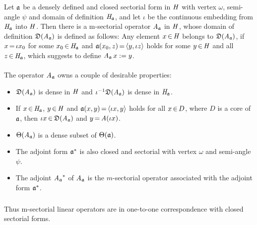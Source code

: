 \documentclass[11pt,twoside]{article}
\begin{document}
\begin{theorem1}\label{FIRST_REPRESENTATION_THEOREM}
Let $\mathfrak{a}$ be a densely defined and closed sectorial form in $\mathit{H}$
with vertex $\omega$, semi-angle $\psi$ and domain of definition $\mathit{H}_{\mathfrak{a}}$,
and let $\iota$ be the continuous embedding from $\mathit{H}_{\mathfrak{a}}$ into $\mathit{H}$.
Then there is a m-sectorial operator $\mathit{A}_{\mathfrak{a}}$ in $\mathit{H}$,
whose domain of definition $\mathfrak{D}(\mathit{A}_{\mathfrak{a}})$ is defined as follows:
Any element $x {\,\in\,} \mathit{H}$ belongs to $\mathfrak{D}(\mathit{A}_{\mathfrak{a}})$,
if $x {\,=\,} \iota x_0$ for some $x_0 {\,\in\,} \mathit{H}_{\mathfrak{a}}$ and
$\mathfrak{a}(x_0,z) {\,=\,} \langle y,\iota z \rangle$ holds
for some $y {\,\in\,} \mathit{H}$ and all $z {\,\in\,} \mathit{H}_{\mathfrak{a}}$,
which suggests to define $\mathit{A}_{\mathfrak{a}} \, x := y$.

\paragraph{} %
The operator $\mathit{A}_{\mathfrak{a}}$ owns a couple of desirable properties:

\begin{itemize}[leftmargin=9mm]
\item[(a)]
$\mathfrak{D}(\mathit{A}_{\mathfrak{a}})$ is dense in $\mathit{H}$
and $\iota^{-1} \mathfrak{D}(\mathit{A}_{\mathfrak{a}})$ is dense in $\mathit{H}_{\mathfrak{a}}$.

\item[(b)]
If $x {\,\in\,} \mathit{H}_{\mathfrak{a}}$, $y {\,\in\,} \mathit{H}$
and $\mathfrak{a}(x,y) {\,=\,} \langle \iota x,y \rangle$ holds for all $x {\,\in\,} D$,
where $D$ is a core of $\mathfrak{a}$,
then $\iota x {\,\in\,} \mathfrak{D}(\mathit{A}_{\mathfrak{a}})$ and $y {\,=\,} \mathit{A} (\iota x)$.

\item[(c)]
$\Theta(\mathit{A}_{\mathfrak{a}})$ is a dense subset of $\Theta(\mathfrak{a})$.

\item[(d)]
The adjoint form $\mathfrak{a}^*$ is also closed and sectorial
with vertex $\omega$ and semi-angle $\psi$.

\item[(e)]
The adjoint ${\mathit{A}_{\mathfrak{a}}}^*$ of $\mathit{A}_{\mathfrak{a}}$
is the $m$-sectorial operator associated with the adjoint form $\mathfrak{a}^*$.
\end{itemize}
\end{theorem1}

\subparagraph{}
Thus m-sectorial linear operators are in one-to-one correspondence
with closed sectorial forms.
\end{document}
